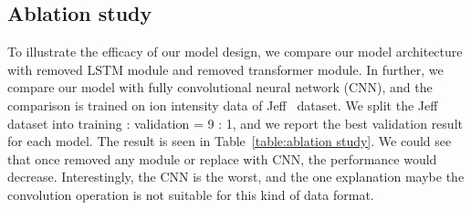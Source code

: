\subsection{Ablation study}
To illustrate the efficacy of our model design, we compare our model architecture with removed LSTM module and removed transformer module. In further, we compare our model with fully convolutional neural network (CNN), and the comparison is trained on ion intensity data of Jeff~\cite{liu2018vivo} dataset. We split the Jeff dataset into training : validation = 9 : 1, and we report the best validation result for each model. The result is seen in Table~\ref{table:ablation study}. We could see that once removed any module or replace with CNN, the performance would decrease. Interestingly, the CNN is the worst, and the one explanation maybe the convolution operation is not suitable for this kind of data format.
